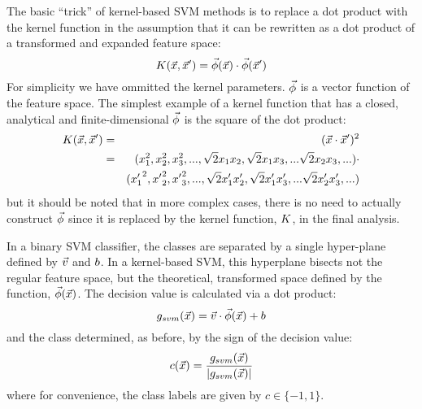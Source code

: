 \documentclass{article}
\newenvironment{eqnnon}{\begin{equation}}{\end{equation}}
\begin{document}
The basic ``trick'' of kernel-based SVM methods is to replace a dot product
with the kernel function in the assumption that it can be rewritten
as a dot product of a transformed and expanded feature space:
\begin{eqnnon}
	\vectorkernel(\point, \point^\prime) = \expandedspace(\point) \cdot \expandedspace(\point^\prime)
	\label{phi_def}
\end{eqnnon}
For simplicity we have ommitted the kernel parameters.
$\vec\phi$ is a vector function of the feature space.
The simplest example of a kernel function that has a closed, analytical and
finite-dimensional $\vec\phi$ is the square of the dot product:
\begin{eqnarray}
	K(\vec {x}, \vec {x}^\prime) & = & (\vec {x} \cdot \vec {x}^\prime)^2 \\ \nonumber
					 & = & (x_1^2, x_2^2, x_3^2, ..., \sqrt{2} x_1 x_2, \sqrt{2} x_1 x_3, ... \sqrt{2} x_2 x_3, ...) \cdot \\ \nonumber
      & &	 ({x^\prime_1}^2, {x^\prime}_2^2, {x^\prime}_3^2, ..., \sqrt{2} x^\prime_1 x^\prime_2, \sqrt{2} x^\prime_1 x^\prime_3, ... \sqrt{2} x^\prime_2 x^\prime_3, ...) 
\end{eqnarray}
but it should be noted that in more complex cases, 
there is no need to actually construct $\vec\phi$ since it is replaced by the 
kernel function, $K$, in the final analysis.

In a binary SVM classifier, the classes are separated by a single hyper-plane
defined by $\vec v$ and $b$.
In a kernel-based SVM, this hyperplane bisects not the regular feature
space, but the theoretical, transformed space defined by the function,
$\vec\phi(\vec {x})$.
The decision value is calculated via a dot product:
\begin{equation}
	g_{svm}(\vec {x})=\vec v \cdot \vec\phi(\vec {x}) + b
	\label{decision_function0}
\end{equation}
and the class determined, as before, by the sign of the decision value:
\begin{equation}
	c(\vec {x}) = \frac{g_{svm}(\vec {x})}{|g_{svm}(\vec {x})|}
	\label{class_value}
\end{equation}
where for convenience, the class labels are given by $c \in \lbrace -1, 1 \rbrace$.
\end{document}
